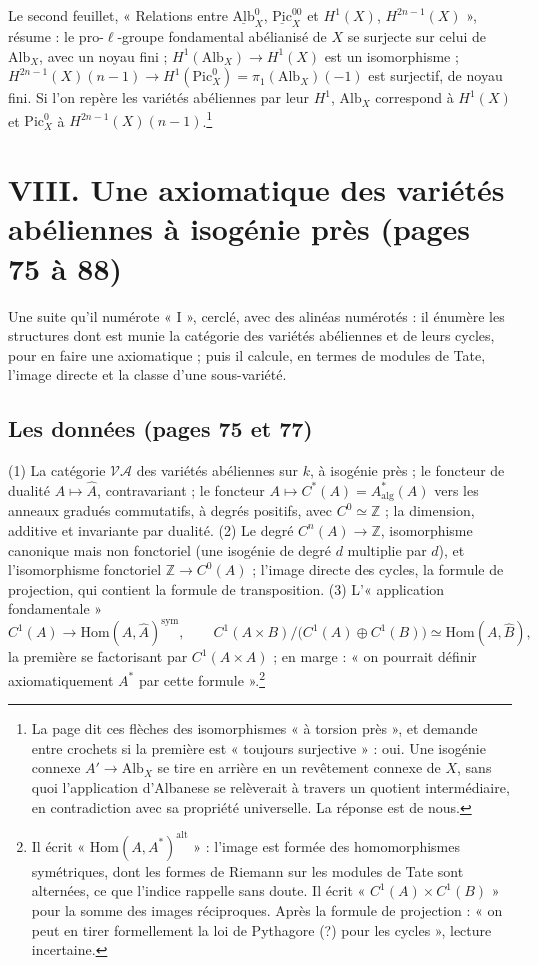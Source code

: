 \documentclass[11pt,a4paper]{article}
\begin{document}
Le second feuillet, « Relations entre $\underline{\mathrm{Alb}}^{0}_{X}$,
$\underline{\mathrm{Pic}}^{00}_{X}$ et $H^{1}(X)$, $H^{2n-1}(X)$ », résume : le
pro-$\ell$-groupe fondamental abélianisé de $X$ se surjecte sur celui de
$\mathrm{Alb}_{X}$, avec un noyau fini ; $H^{1}(\mathrm{Alb}_{X}) \to H^{1}(X)$
est un isomorphisme ; $H^{2n-1}(X)(n-1) \to H^{1}(\mathrm{Pic}^{0}_{X}) =
\pi_{1}(\mathrm{Alb}_{X})(-1)$ est surjectif, de noyau fini. Si l'on repère les
variétés abéliennes par leur $H^{1}$, $\mathrm{Alb}_{X}$ correspond à
$H^{1}(X)$ et $\mathrm{Pic}^{0}_{X}$ à $H^{2n-1}(X)(n-1)$.\footnote{La page dit
ces flèches des isomorphismes « à torsion près », et demande entre crochets si
la première est « toujours surjective » : oui. Une isogénie connexe $A' \to
\mathrm{Alb}_{X}$ se tire en arrière en un revêtement connexe de $X$, sans quoi
l'application d'Albanese se relèverait à travers un quotient intermédiaire, en
contradiction avec sa propriété universelle. La réponse est de nous.}

\section*{VIII. Une axiomatique des variétés abéliennes à isogénie près (pages
75 à 88)}

Une suite qu'il numérote « I », cerclé, avec des alinéas numérotés : il
énumère les structures dont est munie la catégorie des variétés abéliennes et
de leurs cycles, pour en faire une axiomatique ; puis il calcule, en termes de
modules de Tate, l'image directe et la classe d'une sous-variété.

\subsection*{Les données (pages 75 et 77)}

(1) La catégorie $\mathcal{VA}$ des variétés abéliennes sur $k$, à isogénie
près ; le foncteur de dualité $A \mapsto \hat{A}$, contravariant ; le foncteur
$A \mapsto C^{*}(A) = A^{*}_{\mathrm{alg}}(A)$ vers les anneaux gradués
commutatifs, à degrés positifs, avec $C^{0} \simeq \mathbb{Z}$ ; la dimension,
additive et invariante par dualité. (2) Le degré $C^{n}(A) \to \mathbb{Z}$,
isomorphisme canonique mais non fonctoriel (une isogénie de degré $d$
multiplie par $d$), et l'isomorphisme fonctoriel $\mathbb{Z} \to C^{0}(A)$ ;
l'image directe des cycles, la formule de projection, qui contient la formule de
transposition. (3) L'« application fondamentale »
\[
C^{1}(A) \longrightarrow \mathrm{Hom}(A, \hat{A})^{\mathrm{sym}} ,
\qquad
C^{1}(A \times B)/\bigl(C^{1}(A) \oplus C^{1}(B)\bigr) \simeq \mathrm{Hom}(A,
\hat{B}) ,
\]
la première se factorisant par $C^{1}(A \times A)$ ; en marge : « on pourrait
définir axiomatiquement $A^{*}$ par cette formule ».\footnote{Il écrit
« $\mathrm{Hom}(A, A^{*})^{\mathrm{alt}}$ » : l'image est formée des
homomorphismes symétriques, dont les formes de Riemann sur les modules de Tate
sont alternées, ce que l'indice rappelle sans doute. Il écrit « $C^{1}(A) \times
C^{1}(B)$ » pour la somme des images réciproques. Après la formule de
projection : « on peut en tirer formellement la loi de Pythagore (?) pour les
cycles », lecture incertaine.}
\end{document}
